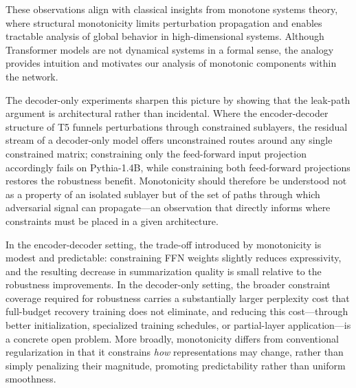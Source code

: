 \documentclass{article}
\theoremstyle{plain}
\theoremstyle{definition}
\theoremstyle{remark}
\begin{document}
These observations align with classical insights from monotone systems theory, where structural monotonicity limits perturbation propagation and enables tractable analysis of global behavior in high-dimensional systems. Although Transformer models are not dynamical systems in a formal sense, the analogy provides intuition and motivates our analysis of monotonic components within the network.

The decoder-only experiments sharpen this picture by showing that the leak-path argument is architectural rather than incidental. Where the encoder-decoder structure of T5 funnels perturbations through constrained sublayers, the residual stream of a decoder-only model offers unconstrained routes around any single constrained matrix; constraining only the feed-forward input projection accordingly fails on Pythia-1.4B, while constraining both feed-forward projections restores the robustness benefit. Monotonicity should therefore be understood not as a property of an isolated sublayer but of the set of paths through which adversarial signal can propagate—an observation that directly informs where constraints must be placed in a given architecture.

In the encoder-decoder setting, the trade-off introduced by monotonicity is modest and predictable: constraining FFN weights slightly reduces expressivity, and the resulting decrease in summarization quality is small relative to the robustness improvements. In the decoder-only setting, the broader constraint coverage required for robustness carries a substantially larger perplexity cost that full-budget recovery training does not eliminate, and reducing this cost—through better initialization, specialized training schedules, or partial-layer application—is a concrete open problem. More broadly, monotonicity differs from conventional regularization in that it constrains \emph{how} representations may change, rather than simply penalizing their magnitude, promoting predictability rather than uniform smoothness.
\end{document}
